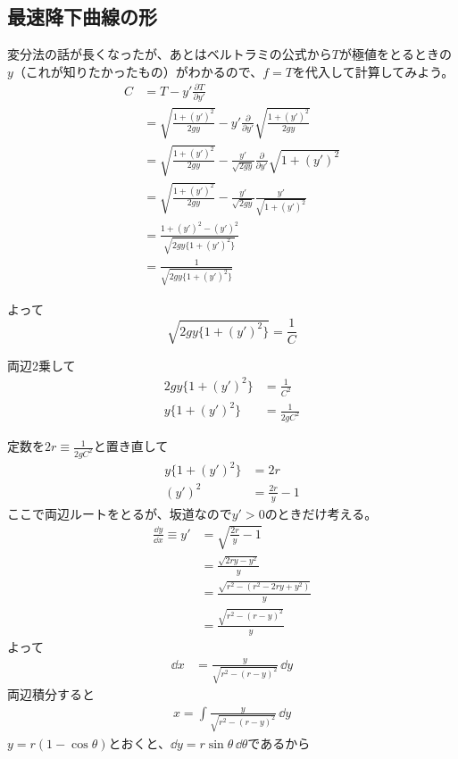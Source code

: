 \subsection{最速降下曲線の形}
変分法の話が長くなったが、あとはベルトラミの公式から$T$が極値をとるときの$y$（これが知りたかったもの）がわかるので、$f = T$を代入して計算してみよう。
\begin{align*}
  C &= T - y'\frac{\partial T}{\partial y'} \\
  &= \sqrt{\frac{1 + (y')^2}{2gy}} - y'\frac{\partial}{\partial y'} \sqrt{\frac{1 + (y')^2}{2gy}} \\
  &= \sqrt{\frac{1 + (y')^2}{2gy}} - \frac{y'}{\sqrt{2gy}} \frac{\partial}{\partial y'} \sqrt{1 + (y')^2} \\
  &= \sqrt{\frac{1 + (y')^2}{2gy}} - \frac{y'}{\sqrt{2gy}} \frac{y'}{\sqrt{1 + (y')^2}} \\
  &= \frac{1 + (y')^2 - (y')^2}{\sqrt{2gy\{1 + (y')^2\}}} \\
  &= \frac{1}{\sqrt{2gy\{1 + (y')^2\}}}
\end{align*}\par
よって
$$\sqrt{2gy\{1 + (y')^2\}} = \frac{1}{C}$$\par
両辺2乗して
\begin{align*}
  2gy\{1 + (y')^2\} &= \frac{1}{C^2} \\
  y\{1 + (y')^2\} &= \frac{1}{2gC^2}
\end{align*}\par
定数を$2r \equiv \frac{1}{2gC^2}$と置き直して
\begin{align*}
  y\{1 + (y')^2\} &= 2r \\
  (y')^2 &= \frac{2r}{y} - 1
\end{align*}
ここで両辺ルートをとるが、坂道なので$y' > 0$のときだけ考える。
\begin{align*}
  \frac{\dd y}{\dd x} \equiv y' &= \sqrt{\frac{2r}{y} - 1} \\
  &= \frac{\sqrt{2ry - y^2}}{y} \\
  &= \frac{\sqrt{r^2 - (r^2 - 2ry + y^2)}}{y} \\
  &= \frac{ \sqrt{r^2 - (r - y)^2} }{y}
\end{align*}
よって
\begin{align*}
  \dd x & = \frac{y}{ \sqrt{r^2 - (r - y)^2} }\,\dd y
\end{align*}
両辺積分すると
\begin{align*}
  x = \int \frac{y}{ \sqrt{r^2 - (r - y)^2} }\,\dd y
\end{align*}
$y = r(1 - \cos\theta)$とおくと、$\dd y = r\sin\theta \,\dd \theta$であるから
